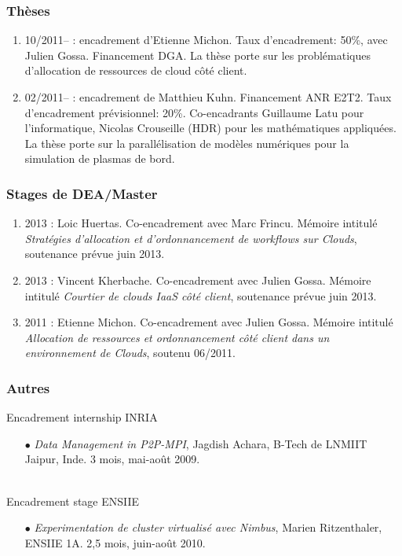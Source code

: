 \documentclass[11pt]{article}
\begin{document}
\subsubsection{Thèses}
\begin{enumerate}
\item 10/2011-- : encadrement d'Etienne Michon. Taux d'encadrement: 50\%,
avec Julien Gossa. Financement DGA. La thèse porte sur les problématiques
d'allocation de ressources de cloud côté client.\\

\item 02/2011-- : encadrement de Matthieu Kuhn. Financement ANR E2T2. 
Taux d'encadrement prévisionnel: 20\%. Co-encadrants Guillaume Latu pour 
l'informatique, Nicolas Crouseille (HDR) pour les mathématiques appliquées. 
La thèse porte sur la parallélisation de modèles 
numériques pour la simulation de plasmas de bord.\\
\end{enumerate}

\subsubsection{Stages de DEA/Master}
\begin{enumerate}
\item 2013 : Loic Huertas. Co-encadrement avec Marc Frincu.
Mémoire intitulé \textit{Stratégies d'allocation et d'ordonnancement de workflows sur Clouds},
soutenance prévue juin 2013.

\item 2013 : Vincent Kherbache. Co-encadrement avec Julien Gossa.
Mémoire intitulé \textit{Courtier de clouds IaaS côté client},
soutenance prévue juin 2013.

\item 2011 : Etienne Michon. Co-encadrement avec Julien Gossa. Mémoire 
intitulé  \textit{Allocation de ressources et ordonnancement côté client dans 
un environnement de Clouds}, soutenu 06/2011.
\end{enumerate}

\subsubsection{Autres}
Encadrement internship INRIA
\smallskip
\begin{itemize}
\item[$\bullet$]  {\it Data Management in P2P-MPI}, Jagdish Achara, B-Tech de 
LNMIIT Jaipur, Inde. 3 mois, mai-août 2009. 
\end{itemize}
~\\
Encadrement stage ENSIIE
\smallskip
\begin{itemize}
\item[$\bullet$]  {\it Experimentation de cluster virtualisé avec Nimbus}, 
Marien Ritzenthaler, ENSIIE 1A. 2,5 mois, juin-août 2010. 
\end{itemize}
\end{document}
